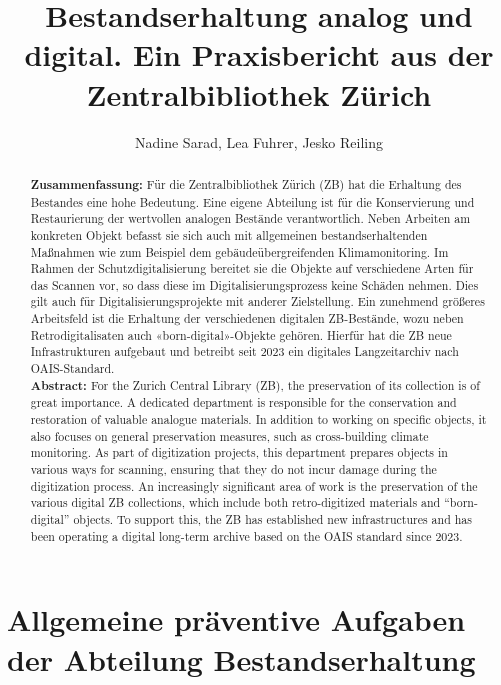 \documentclass[a4paper,
fontsize=11pt,
oneside,
numbers=noperiodatend,
parskip=half-,
bibliography=totoc,
final
]{scrartcl}
\title{\LARGE{Bestandserhaltung analog und digital. Ein Praxisbericht aus der Zentralbibliothek Zürich}}%
\author{Nadine Sarad, Lea Fuhrer, Jesko Reiling} %
\date{}
\begin{document}
\maketitle
\thispagestyle{fancyplain} 

\begin{abstract}
\noindent
\textbf{Zusammenfassung:} Für die Zentralbibliothek Zürich (ZB) hat die
Erhaltung des Bestandes eine hohe Bedeutung. Eine eigene Abteilung ist
für die Konservierung und Restaurierung der wertvollen analogen Bestände
verantwortlich. Neben Arbeiten am konkreten Objekt befasst sie sich auch
mit allgemeinen bestandserhaltenden Maßnahmen wie zum Beispiel dem
gebäudeübergreifenden Klimamonitoring. Im Rahmen der
Schutzdigitalisierung bereitet sie die Objekte auf verschiedene Arten
für das Scannen vor, so dass diese im Digitalisierungsprozess keine
Schäden nehmen. Dies gilt auch für Digitalisierungsprojekte mit anderer
Zielstellung. Ein zunehmend größeres Arbeitsfeld ist die Erhaltung der
verschiedenen digitalen ZB-Bestände, wozu neben Retrodigitalisaten auch
«born-digital»-Objekte gehören. Hierfür hat die ZB neue Infrastrukturen
aufgebaut und betreibt seit 2023 ein digitales Langzeitarchiv nach
OAIS-Standard.\\

\noindent
\textbf{Abstract:} For the Zurich Central Library (ZB), the preservation
of its collection is of great importance. A dedicated department is
responsible for the conservation and restoration of valuable analogue
materials. In addition to working on specific objects, it also focuses
on general preservation measures, such as cross-building climate
monitoring. As part of digitization projects, this department prepares
objects in various ways for scanning, ensuring that they do not incur
damage during the digitization process. An increasingly significant area
of work is the preservation of the various digital ZB collections, which
include both retro-digitized materials and \enquote{born-digital} objects. To
support this, the ZB has established new infrastructures and has been
operating a digital long-term archive based on the OAIS standard since
2023.
\end{abstract}

\hypertarget{allgemeine-pruxe4ventive-aufgaben-der-abteilung-bestandserhaltung}{%
\section{Allgemeine präventive Aufgaben der Abteilung
Bestandserhaltung}\label{allgemeine-pruxe4ventive-aufgaben-der-abteilung-bestandserhaltung}}
\end{document}
